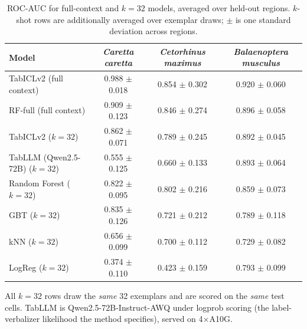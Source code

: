 \begin{table}[t]
\centering
\caption{ROC-AUC for full-context and $k=32$ models, averaged over held-out regions. $k$-shot rows are additionally averaged over exemplar draws; $\pm$ is one standard deviation across regions.}
\label{tab:models-k32}
\begin{tabular}{lccc}
\toprule
Model & \emph{Caretta caretta} & \emph{Cetorhinus maximus} & \emph{Balaenoptera musculus} \\
\midrule
TabICLv2 (full context) & 0.988 $\pm$ 0.018 & 0.854 $\pm$ 0.302 & 0.920 $\pm$ 0.060 \\
RF-full (full context) & 0.909 $\pm$ 0.123 & 0.846 $\pm$ 0.274 & 0.896 $\pm$ 0.058 \\
\addlinespace
TabICLv2 ($k=32$) & 0.862 $\pm$ 0.071 & 0.789 $\pm$ 0.245 & 0.892 $\pm$ 0.045 \\
TabLLM (Qwen2.5-72B) ($k=32$) & 0.555 $\pm$ 0.125 & 0.660 $\pm$ 0.133 & 0.893 $\pm$ 0.064 \\
Random Forest ($k=32$) & 0.822 $\pm$ 0.095 & 0.802 $\pm$ 0.216 & 0.859 $\pm$ 0.073 \\
GBT ($k=32$) & 0.835 $\pm$ 0.126 & 0.721 $\pm$ 0.212 & 0.789 $\pm$ 0.118 \\
kNN ($k=32$) & 0.656 $\pm$ 0.099 & 0.700 $\pm$ 0.112 & 0.729 $\pm$ 0.082 \\
LogReg ($k=32$) & 0.374 $\pm$ 0.110 & 0.423 $\pm$ 0.159 & 0.793 $\pm$ 0.099 \\
\bottomrule
\end{tabular}
\begin{minipage}{\linewidth}\footnotesize All $k=32$ rows draw the \emph{same} 32 exemplars and are scored on the \emph{same} test cells. TabLLM is Qwen2.5-72B-Instruct-AWQ under logprob scoring (the label-verbalizer likelihood the method specifies), served on 4$\times$A10G.\end{minipage}
\end{table}
